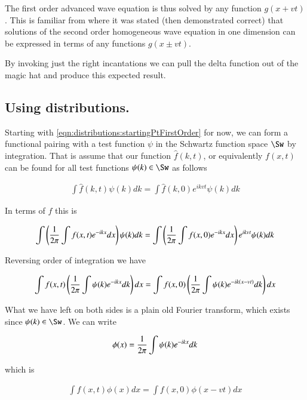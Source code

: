 The first order advanced wave equation is thus solved by any function $g(x + vt)$.  This
is familiar from
\citep{french1971vaw} where it was stated (then demonstrated correct) that solutions of the second
order homogeneous wave equation in one dimension can be expressed in terms of any functions
$g(x \pm vt)$.

By invoking just the right incantations we can pull the delta function out of the magic hat and 
produce this expected result.

\subsection{Using distributions. }

Starting with \ref{eqn:distributions:startingPtFirstOrder} for now, we can form a functional pairing with a test function $\psi$ in the Schwartz function space $\Sw$ by integration.  That is
assume that our function $\hat{f}(k,t)$, or equivalently $f(x,t)$ can be found for all test functions $\psi(k) \in \Sw$ as follows

\begin{align*}
\int {\hat{f}}(k,t) \psi(k) dk = \int \hat{f}(k,0) e^{i k v t} \psi(k) dk
\end{align*}

In terms of $f$ this is

\begin{align*}
\int \left( \frac{1}{2\pi} \int f(x,t) e^{-i k x} dx \right) \psi(k) dk = \int \left(\frac{1}{2\pi} \int f(x,0) e^{-i k x} dx \right) e^{i k v t} \psi(k) dk
\end{align*}

Reversing order of integration we have

\begin{align*}
\int f(x,t) \left( \frac{1}{2\pi} \int \psi(k) e^{-i k x} dk \right) dx = \int f(x,0) \left(\frac{1}{2\pi} \int \psi(k) e^{-i k (x - v t)} dk \right) dx
\end{align*}

What we have left on both sides is a plain old Fourier transform, which exists since $\psi(k) \in \Sw$. We can write

\begin{align*}
\phi(x) = \frac{1}{2\pi} \int \psi(k) e^{-i k x} dk 
\end{align*}

which is

\begin{align*}
\int f(x,t) \phi(x) dx = \int f(x,0) \phi(x - vt) dx
\end{align*}

